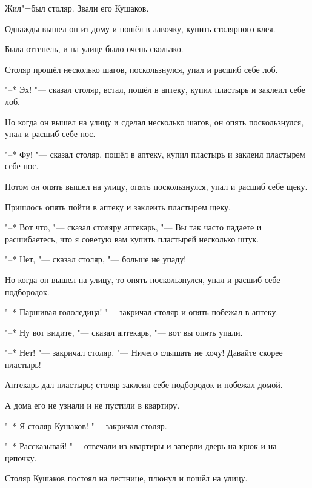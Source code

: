 Жил"=был столяр. Звали его Кушаков.

Однажды вышел он из дому и пошёл в лавочку, купить столярного клея.

Была оттепель, и на улице было очень скользко.

Столяр прошёл несколько шагов, поскользнулся, упал и расшиб себе лоб.

"--* Эх! "--- сказал столяр, встал, пошёл в аптеку, купил пластырь и заклеил себе лоб.

Но когда он вышел на улицу и сделал несколько шагов, он опять поскользнулся, упал и расшиб себе нос.

"--* Фу! "--- сказал столяр, пошёл в аптеку, купил пластырь и заклеил пластырем себе нос.

Потом он опять вышел на улицу, опять поскользнулся, упал и расшиб себе щеку.

Пришлось опять пойти в аптеку и заклеить пластырем щеку.

"--* Вот что, "--- сказал столяру аптекарь, "--- Вы так часто падаете и расшибаетесь, что я советую вам купить пластырей несколько штук.

"--* Нет, "--- сказал столяр, "--- больше не упаду!

Но когда он вышел на улицу, то опять поскользнулся, упал и расшиб себе подбородок.

"--* Паршивая гололедица! "--- закричал столяр и опять побежал в аптеку.

"--* Ну вот видите, "--- сказал аптекарь, "--- вот вы опять упали.

"--* Нет! "--- закричал столяр. "--- Ничего слышать не хочу! Давайте скорее пластырь!

Аптекарь дал пластырь; столяр заклеил себе подбородок и побежал домой.

А дома его не узнали и не пустили в квартиру.

"--* Я столяр Кушаков! "--- закричал столяр.

"--* Рассказывай! "--- отвечали из квартиры и заперли дверь на крюк и на цепочку.

Столяр Кушаков постоял на лестнице, плюнул и пошёл на улицу.